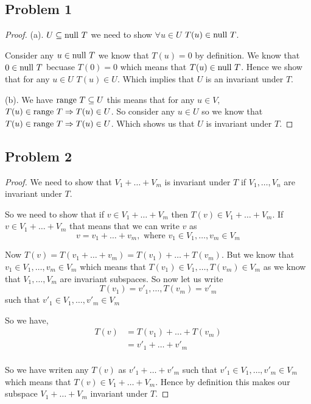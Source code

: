 \documentclass[a4paper]{report}
\begin{document}
\subsection*{Problem 1}
\begin{proof}
   
(a). $U \subseteq \text{null } T$ we need to show $\forall u \in U$ $T(u) \in \text{null } T$.

Consider any $u \in \text{null } T$ we know that $T(u) = 0$ by definition. We know that $0 \in \text{null } T$ becuase $T(0) = 0$ which means that $T(u) \in \text{null } T$. Hence we show that for any $u \in U$ $T(u) \in U$. Which implies that  $U$ is an invariant under $T$.

\vspace{1em}
(b). We have $\text{range } T \subseteq U$ this means  that for any $u \in V,$ $T(u) \in \text{range } T \Rightarrow T(u) \in U$. So consider any $u \in U$ so we know that $T(u) \in \text{range } T \Rightarrow T(u) \in U$. Which shows us that $U$ is invariant under $T$.


\end{proof}

\subsection*{Problem 2}
\begin{proof}
   
We need to show that $V_1 + \dots +  V_m$ is invariant under $T$ if $V_1,\dots,V_n$ are invariant under $T$. 

So we need to show that if  $v \in V_1 + \dots + V_m$ then $T(v) \in V_1 + \dots + V_m$. If $v \in V_1 + \dots + V_m$ that means that we can write $v$ as 
$$ v = v_1 + \dots + v_m, \text{ where } v_1 \in V_1,\dots , v_m \in V_m $$ 

Now $T(v) = T(v_1 + \dots + v_m) = T(v_1) + \dots + T(v_m)$. But we know that $v_1 \in V_1,\dots ,v_m \in V_m$ which means that $T(v_1) \in V_1,\dots,T(v_m) \in V_m$ as we know that $V_1,\dots,V_m$ are invariant subspaces. So now let us write $$T(v_1) = v'_1 ,\dots , T(v_m) = v'_m$$ such that $v'_1 \in V_1,\dots,v'_m \in V_m$

So we have,
\begin{align*}
   T(v) &= T(v_1) + \dots + T(v_m) \\
   &= v'_1 + \dots + v'_m\\
\end{align*}

So we have writen any $T(v)$ as $v'_1 + \dots + v'_m$ such that  $v'_1 \in V_1,\dots,v'_m \in V_m$ which means that $T(v) \in V_1 + \dots + V_m$.  Hence by definition this makes our subspace $V_1 + \dots + V_m$ invariant under $T$.

\end{proof}
\end{document}
